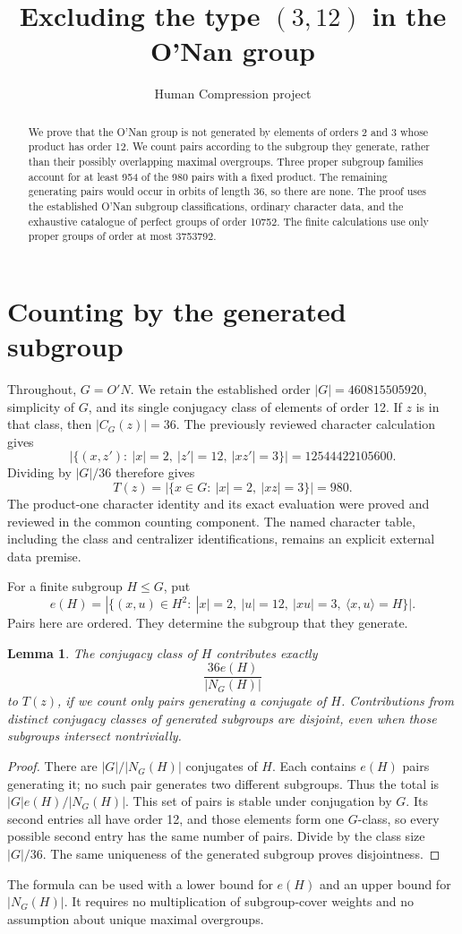 \documentclass[11pt,a4paper]{article}
\title{Excluding the type $(3,12)$ in the O'Nan group}
\author{Human Compression project}\date{}
\newtheorem{lemma}{Lemma}\newtheorem{theorem}[lemma]{Theorem}
\newcommand{\ON}{O'N}
\begin{document}
\maketitle
\begin{abstract}
We prove that the O'Nan group is not generated by elements of orders
2 and 3 whose product has order 12. We count pairs according to the
subgroup they generate, rather than their possibly overlapping maximal
overgroups. Three proper subgroup families account for at least 954
of the 980 pairs with a fixed product. The remaining generating pairs
would occur in orbits of length 36, so there are none. The proof uses
the established O'Nan subgroup classifications, ordinary character data,
and the exhaustive catalogue of perfect groups of order 10752.
The finite calculations use only proper groups of order at most 3753792.
\end{abstract}

\section{Counting by the generated subgroup}
Throughout, $G=\ON$. We retain the established order
$|G|=460815505920$, simplicity of $G$, and its single conjugacy class
of elements of order 12. If $z$ is in that class, then $|C_G(z)|=36$.
The previously reviewed character calculation gives
\[
 |\{(x,z'):\ |x|=2,\ |z'|=12,\ |xz'|=3\}|
       =12544422105600.
\]
Dividing by $|G|/36$ therefore gives
\[
 T(z)=|\{x\in G:\ |x|=2,\ |xz|=3\}|=980.             \tag{1}
\]
The product-one character identity and its exact evaluation were proved
and reviewed in the common counting component. The named character
table, including the class and centralizer identifications, remains
an explicit external data premise.

For a finite subgroup $H\leq G$, put
\[
 e(H)=|\{(x,u)\in H^2:\ |x|=2,\ |u|=12,\ |xu|=3,
                         \ \langle x,u\rangle=H\}|.
\]
Pairs here are ordered. They determine the subgroup that they generate.
\begin{lemma}\label{partition}
The conjugacy class of $H$ contributes exactly
\[
                       \frac{36e(H)}{|N_G(H)|}           \tag{2}
\]
to $T(z)$, if we count only pairs generating a conjugate of $H$.
Contributions from distinct conjugacy classes of generated subgroups
are disjoint, even when those subgroups intersect nontrivially.
\end{lemma}
\begin{proof}
There are $|G|/|N_G(H)|$ conjugates of $H$. Each contains $e(H)$
pairs generating it; no such pair generates two different subgroups.
Thus the total is $|G|e(H)/|N_G(H)|$. This set of pairs is stable
under conjugation by $G$. Its second entries all have order 12, and
those elements form one $G$-class, so every possible second entry
has the same number of pairs. Divide by the class size $|G|/36$.
The same uniqueness of the generated subgroup proves disjointness.
\end{proof}
The formula can be used with a lower bound for $e(H)$ and an upper
bound for $|N_G(H)|$. It requires no multiplication of subgroup-cover
weights and no assumption about unique maximal overgroups.
\end{document}
